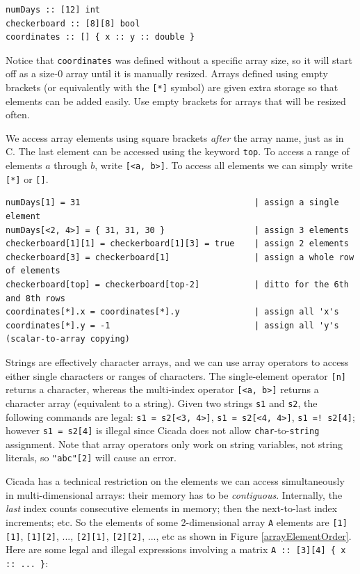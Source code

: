 \documentclass{article}
\newenvironment{code}{
       \begin{list}{}{
               \setlength{\leftmargin}{.4in}
               \setlength{\rightmargin}{0in}
               \setlength{\topsep}{.2in}
       }
       \small
       \item[] }
       { \end{list}   }
\begin{document}
\begin{code} \begin{verbatim}
numDays :: [12] int
checkerboard :: [8][8] bool
coordinates :: [] { x :: y :: double }
\end{verbatim} \end{code}

\noindent Notice that \verb#coordinates# was defined without a specific array size, so it will start off as a size-0 array until it is manually resized.  Arrays defined using empty brackets (or equivalently with the \verb#[*]# symbol) are given extra storage so that elements can be added easily.  Use empty brackets for arrays that will be resized often.

We access array elements using square brackets \emph{after} the array name, just as in C.  The last element can be accessed using the keyword \verb#top#.  To access a range of elements $a$ through $b$, write \verb#[<a, b>]#.  To access all elements we can simply write \verb#[*]# or \verb#[]#.

\begin{code} \begin{verbatim}
numDays[1] = 31                                   | assign a single element
numDays[<2, 4>] = { 31, 31, 30 }                  | assign 3 elements
checkerboard[1][1] = checkerboard[1][3] = true    | assign 2 elements
checkerboard[3] = checkerboard[1]                 | assign a whole row of elements
checkerboard[top] = checkerboard[top-2]           | ditto for the 6th and 8th rows
coordinates[*].x = coordinates[*].y               | assign all 'x's
coordinates[*].y = -1                             | assign all 'y's (scalar-to-array copying)
\end{verbatim} \end{code}

Strings are effectively character arrays, and we can use array operators to access either single characters or ranges of characters.  The single-element operator \verb#[n]# returns a character, whereas the multi-index operator \verb#[<a, b>]# returns a character array (equivalent to a string).  Given two strings \verb#s1# and \verb#s2#, the following commands are legal:  \verb#s1 = s2[<3, 4>]#, \verb#s1 = s2[<4, 4>]#, \verb#s1 =! s2[4]#; however \verb#s1 = s2[4]# is illegal since Cicada does not allow \verb#char#-to-\verb#string# assignment.  Note that array operators only work on string variables, not string literals, so \verb#"abc"[2]# will cause an error.

Cicada has a technical restriction on the elements we can access simultaneously in multi-dimensional arrays:  their memory has to be \emph{contiguous}.  Internally, the \emph{last} index counts consecutive elements in memory; then the next-to-last index increments; etc.  So the elements of some 2-dimensional array \verb#A# elements are \texttt{[1][1]}, \texttt{[1][2]}, ..., \texttt{[2][1]}, \texttt{[2][2]}, ..., etc as shown in Figure \ref{arrayElementOrder}.  Here are some legal and illegal expressions involving a matrix \verb#A :: [3][4] { x :: ... }#:
\end{document}
